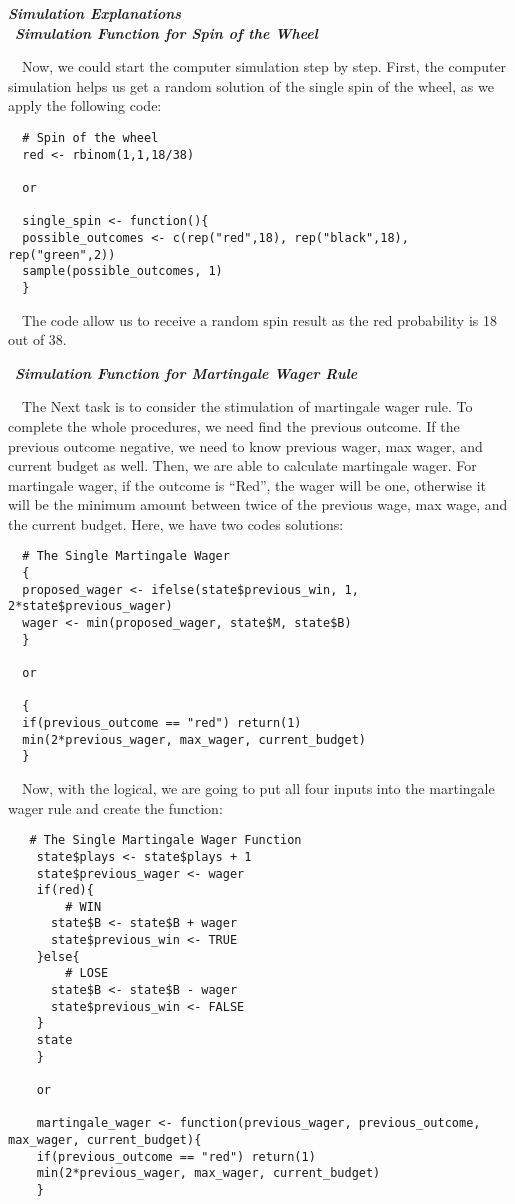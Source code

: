 \documentclass[
]{article}
\begin{document}
\textbf{\emph{Simulation Explanations}}\\
 \textbf{\emph{Simulation Function for Spin of the Wheel}}

 Now, we could start the computer simulation step by step. First, the
computer simulation helps us get a random solution of the single spin of
the wheel, as we apply the following code:

\begin{verbatim}
  # Spin of the wheel
  red <- rbinom(1,1,18/38) 
  
  or 
  
  single_spin <- function(){
  possible_outcomes <- c(rep("red",18), rep("black",18), rep("green",2))
  sample(possible_outcomes, 1)
  }
\end{verbatim}

 The code allow us to receive a random spin result as the red
probability is 18 out of 38.

 \textbf{\emph{Simulation Function for Martingale Wager Rule}}

 The Next task is to consider the stimulation of martingale wager rule.
To complete the whole procedures, we need find the previous outcome. If
the previous outcome negative, we need to know previous wager, max
wager, and current budget as well. Then, we are able to calculate
martingale wager. For martingale wager, if the outcome is ``Red'', the
wager will be one, otherwise it will be the minimum amount between twice
of the previous wage, max wage, and the current budget. Here, we have
two codes solutions:

\begin{verbatim}
  # The Single Martingale Wager
  {
  proposed_wager <- ifelse(state$previous_win, 1, 2*state$previous_wager)
  wager <- min(proposed_wager, state$M, state$B)
  }
  
  or
  
  {
  if(previous_outcome == "red") return(1)
  min(2*previous_wager, max_wager, current_budget)
  }
\end{verbatim}

 Now, with the logical, we are going to put all four inputs into the
martingale wager rule and create the function:

\begin{verbatim}
   # The Single Martingale Wager Function
    state$plays <- state$plays + 1
    state$previous_wager <- wager
    if(red){
        # WIN
      state$B <- state$B + wager
      state$previous_win <- TRUE
    }else{
        # LOSE
      state$B <- state$B - wager
      state$previous_win <- FALSE
    }
    state
    }
    
    or 
  
    martingale_wager <- function(previous_wager, previous_outcome, max_wager, current_budget){
    if(previous_outcome == "red") return(1)
    min(2*previous_wager, max_wager, current_budget)
    }
    
\end{verbatim}
\end{document}
